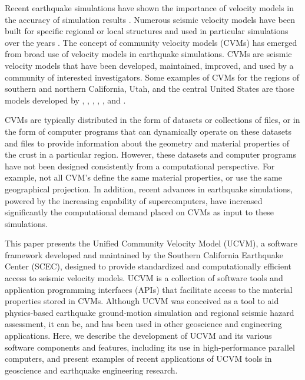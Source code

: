 Recent earthquake simulations have shown the importance of velocity models in the accuracy of simulation results \citep[e.g.,][]{Taborda_2014_BSSA}. Numerous seismic velocity models have been built for specific regional or local structures and used in particular simulations over the years \citep[e.g.,][]{Frankel_1992_BSSA, Brocher_2008_BSSA, Graves_2008_BSSA}. The concept of community velocity models (CVMs) has emerged from broad use of velocity models in earthquake simulations. CVMs are seismic velocity models that have been developed, maintained, improved, and used by a community of interested investigators. Some examples of CVMs for the regions of southern and northern California, Utah, and the central United States are those models developed by \citet{Kohler_2003_BSSA}, \citet{Suss_2003_JGR}, \citet{Brocher_2006_Proc}, \citet{Magistrale_2006_Tech}, \citet{Plesch_2011_SCEC}, and \citet{RamirezGuzman_2012_BSSA}. 

CVMs are typically distributed in the form of datasets or collections of files, or in the form of computer programs that can dynamically operate on these datasets and files to provide information about the geometry and material properties of the crust in a particular region. However, these datasets and computer programs have not been designed consistently from a computational perspective. For example, not all CVM's define the same material properties, or use the same geographical projection. In addition, recent advances in earthquake simulations, powered by the increasing capability of supercomputers, have increased significantly the computational demand placed on CVMs as input to these simulations.

This paper presents the Unified Community Velocity Model (UCVM), a software framework developed and maintained by the Southern California Earthquake Center (SCEC), designed to provide standardized and computationally efficient access to seismic velocity models. UCVM is a collection of software tools and application programming interfaces (APIs) that facilitate access to the material properties stored in CVMs. Although UCVM was conceived as a tool to aid physics-based earthquake ground-motion simulation and regional seismic hazard assessment, it can be, and has been used in other geoscience and engineering applications. Here, we describe the development of UCVM and its various software components and features, including its use in high-performance parallel computers, and present examples of recent applications of UCVM tools in geoscience and earthquake engineering research.

